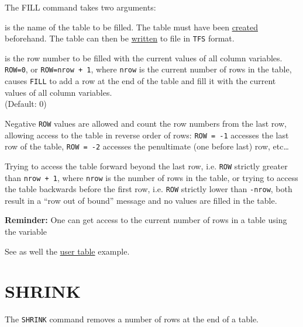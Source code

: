 The FILL command takes two arguments:
\begin{madlist}
   is the name of the table to be filled. The table must
  have been \hyperref[sec:create]{created} beforehand. 
  The table can then be \hyperref[sec:write]{written} to file in {\tt TFS}
  format. 

   is the row number to be filled with the current values of
  all column variables. \\ 
  {\tt ROW=0}, or {\tt ROW=nrow + 1}, where {\tt nrow} is the current
  number of rows in the table, causes {\tt FILL} to add a row at
  the end of the table and fill it with the current values of all
  column variables. \\ (Default: 0) 
\end{madlist}

Negative {\tt ROW} values are allowed and count the row numbers from
the last row, allowing access to the table in reverse order of rows:
{\tt ROW = -1} accesses the last row of the table,
{\tt ROW = -2} accesses the penultimate (one before last) row,
etc\ldots  


Trying to access the table forward beyond the last row, i.e. \texttt{ROW}
strictly greater than {\tt nrow + 1}, where {\tt nrow} is the number of
rows in the table, or trying to access the table backwards before the
first row, i.e. \texttt{ROW} strictly lower than {\tt -nrow}, both
result in a ``row out of bound'' message and no values are filled in the
table. 


{\bf Reminder:} One can get access to the current number of rows in a
table using the variable 

See as well the \href{../Introduction/select.html#ucreate}{user table}
example.   

\section{SHRINK} 
\label{sec:shrink}
The {\tt SHRINK} command removes a number of rows at the end of a table.

